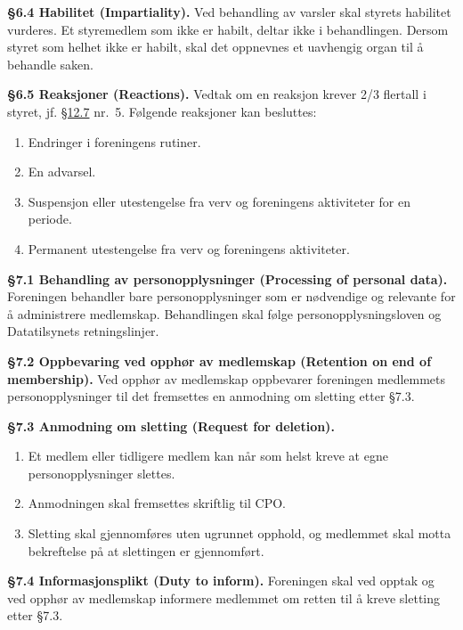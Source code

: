 \documentclass{../../../Common/Latex/Templates/rapport}
\begin{document}
\textbf{\S 6.4 Habilitet (Impartiality).}\label{bylaw:6.4} Ved behandling av varsler skal styrets habilitet vurderes. Et styremedlem som ikke er habilt, deltar ikke i behandlingen. Dersom styret som helhet ikke er habilt, skal det oppnevnes et uavhengig organ til å behandle saken.

\textbf{\S 6.5 Reaksjoner (Reactions).}\label{bylaw:6.5} Vedtak om en reaksjon krever 2/3 flertall i styret, jf. \hyperref[bylaw:12.7]{\S 12.7} nr.\ 5. Følgende reaksjoner kan besluttes:
\begin{enumerate}
  \item Endringer i foreningens rutiner.
  \item En advarsel.
  \item Suspensjon eller utestengelse fra verv og foreningens aktiviteter for en periode.
  \item Permanent utestengelse fra verv og foreningens aktiviteter.
\end{enumerate}

\label{bylaw:7}
\textbf{\S 7.1 Behandling av personopplysninger (Processing of personal data).}\label{bylaw:7.1} Foreningen behandler bare personopplysninger som er nødvendige og relevante for å administrere medlemskap. Behandlingen skal følge personopplysningsloven og Datatilsynets retningslinjer.

\textbf{\S 7.2 Oppbevaring ved opphør av medlemskap (Retention on end of membership).}\label{bylaw:7.2} Ved opphør av medlemskap oppbevarer foreningen medlemmets personopplysninger til det fremsettes en anmodning om sletting etter \S7.3.

\textbf{\S 7.3 Anmodning om sletting (Request for deletion).}\label{bylaw:7.3}
\begin{enumerate}
  \item Et medlem eller tidligere medlem kan når som helst kreve at egne personopplysninger slettes.
  \item Anmodningen skal fremsettes skriftlig til CPO.
  \item Sletting skal gjennomføres uten ugrunnet opphold, og medlemmet skal motta bekreftelse på at slettingen er gjennomført.
\end{enumerate}

\textbf{\S 7.4 Informasjonsplikt (Duty to inform).}\label{bylaw:7.4} Foreningen skal ved opptak og ved opphør av medlemskap informere medlemmet om retten til å kreve sletting etter \S7.3.


\end{document}
